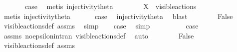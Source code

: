 \begin{isabellebody}
\ {}\isanewline
\ \ \isamarkupfalse%
\ \isamarkupfalse%
\ {\isacharquery}{\kern0pt}case\ \isamarkupfalse%
\ {\isacharparenleft}{\kern0pt}metis\ injectivity{\isacharunderscore}{\kern0pt}theta{\isacharparenleft}{\kern0pt}{}{\isacharparenright}{\kern0pt}{\isacharparenright}{\kern0pt}\isanewline
{}\isamarkupfalse%
\isanewline
\ \ \isamarkupfalse%
\ {}\isanewline
\ \ \isamarkupfalse%
\ {\isacartoucheopen}X\ {\isasymsubseteq}\ visible{\isacharunderscore}{\kern0pt}actions{\isacartoucheclose}\ \isamarkupfalse%
\ {\isacharparenleft}{\kern0pt}metis\ injectivity{\isacharunderscore}{\kern0pt}theta{\isacharparenleft}{\kern0pt}{}{\isacharparenright}{\kern0pt}{\isacharparenright}{\kern0pt}\isanewline
\ \ \isamarkupfalse%
\ {}\ \isamarkupfalse%
\ {\isacharquery}{\kern0pt}case\ \isamarkupfalse%
\ injectivity{\isacharunderscore}{\kern0pt}theta{\isacharparenleft}{\kern0pt}{}{\isacharparenright}{\kern0pt}\ \isamarkupfalse%
\ blast\isanewline
{}\isamarkupfalse%
\isanewline
\ \ \isamarkupfalse%
\ {}\isanewline
\ \ \isamarkupfalse%
\ False\ \isamarkupfalse%
\ visible{\isacharunderscore}{\kern0pt}actions{\isacharunderscore}{\kern0pt}def\ assms{\isacharparenleft}{\kern0pt}{}{\isacharparenright}{\kern0pt}\ \isamarkupfalse%
\ simp\isanewline
\ \ \isamarkupfalse%
\ {\isacharquery}{\kern0pt}case\ \isamarkupfalse%
\ simp\isanewline
{}\isamarkupfalse%
\isanewline
\ \ \isamarkupfalse%
\ {}\isanewline
\ \ \isamarkupfalse%
\ \isamarkupfalse%
\ {\isacharquery}{\kern0pt}case\ \isamarkupfalse%
\ assms{\isacharparenleft}{\kern0pt}{}{\isacharparenright}{\kern0pt}\ no{\isacharunderscore}{\kern0pt}epsilon{\isacharunderscore}{\kern0pt}in{\isacharunderscore}{\kern0pt}tran{\isacharparenleft}{\kern0pt}{}{\isacharparenright}{\kern0pt}\ visible{\isacharunderscore}{\kern0pt}actions{\isacharunderscore}{\kern0pt}def\ \isamarkupfalse%
\ auto\isanewline
{}\isamarkupfalse%
\isanewline
\ \ \isamarkupfalse%
\ {}\isanewline
\ \ \isamarkupfalse%
\ False\ \isamarkupfalse%
\ visible{\isacharunderscore}{\kern0pt}actions{\isacharunderscore}{\kern0pt}def\ assms{\isacharparenleft}{\kern0pt}{}{\isacharparenright}{\kern0pt}\ \isamarkupfalse%

\end{isabellebody}
